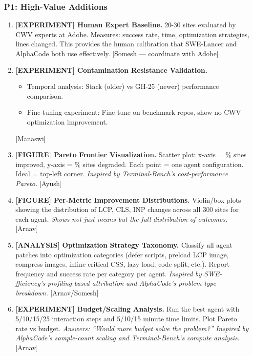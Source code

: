 \subsubsection{P1: High-Value Additions}

\begin{enumerate}
    \item \textbf{[EXPERIMENT] Human Expert Baseline.} 20-30 sites evaluated by CWV experts at Adobe. Measures: success rate, time, optimization strategies, lines changed. This provides the human calibration that SWE-Lancer and AlphaCode both use effectively. [Somesh --- coordinate with Adobe]

    \item \textbf{[EXPERIMENT] Contamination Resistance Validation.}
    \begin{itemize}
        \item Temporal analysis: Stack (older) vs GH-25 (newer) performance comparison.
        \item Fine-tuning experiment: Fine-tune on benchmark repos, show no CWV optimization improvement.
    \end{itemize}
    [Manaswi]

    \item \textbf{[FIGURE] Pareto Frontier Visualization.} Scatter plot: x-axis = \% sites improved, y-axis = \% sites degraded. Each point = one agent configuration. Ideal = top-left corner. \textit{Inspired by Terminal-Bench's cost-performance Pareto.} [Ayush]

    \item \textbf{[FIGURE] Per-Metric Improvement Distributions.} Violin/box plots showing the distribution of LCP, CLS, INP changes across all 300 sites for each agent. \textit{Shows not just means but the full distribution of outcomes.} [Arnav]

    \item \textbf{[ANALYSIS] Optimization Strategy Taxonomy.} Classify all agent patches into optimization categories (defer scripts, preload LCP image, compress images, inline critical CSS, lazy load, code split, etc.). Report frequency and success rate per category per agent. \textit{Inspired by SWE-fficiency's profiling-based attribution and AlphaCode's problem-type breakdown.} [Arnav/Somesh]

    \item \textbf{[EXPERIMENT] Budget/Scaling Analysis.} Run the best agent with 5/10/15/25 interaction steps and 5/10/15 minute time limits. Plot Pareto rate vs budget. \textit{Answers: ``Would more budget solve the problem?'' Inspired by AlphaCode's sample-count scaling and Terminal-Bench's compute analysis.} [Arnav]


\end{enumerate}
